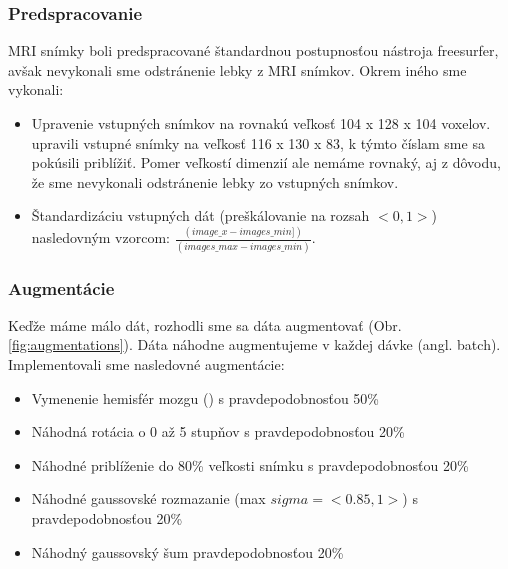 \subsubsection{Predspracovanie}

MRI snímky boli predspracované štandardnou postupnosťou nástroja freesurfer, avšak nevykonali sme odstránenie lebky z MRI snímkov.
Okrem iného sme vykonali:

\begin{itemize}
    \item Upravenie vstupných snímkov na rovnakú veľkosť 104 x 128 x 104 voxelov. \citeauthor*{esmaeilzadeh2018end} upravili vstupné snímky na veľkosť 116 x 130 x 83, k týmto číslam sme sa pokúsili priblížiť. Pomer veľkostí dimenzií ale nemáme rovnaký, aj z dôvodu, že sme nevykonali odstránenie lebky zo vstupných snímkov.
    \item Štandardizáciu vstupných dát (preškálovanie na rozsah $<0, 1>$) nasledovným vzorcom: $\frac{(image\_x - images\_min])}{(images\_max - images\_min)}$.
\end{itemize}

\subsubsection{Augmentácie}

Keďže máme málo dát, rozhodli sme sa dáta augmentovať (Obr. \ref{fig:augmentations}). Dáta náhodne augmentujeme v každej dávke (angl. batch). Implementovali sme nasledovné augmentácie:

\begin{itemize}
    \item Vymenenie hemisfér mozgu (\citeauthor*{esmaeilzadeh2018end}) s pravdepodobnosťou 50\%
    \item Náhodná rotácia o 0 až 5 stupňov s pravdepodobnosťou 20\%
    \item Náhodné priblíženie do 80\% veľkosti snímku s pravdepodobnosťou 20\%
    \item Náhodné gaussovské rozmazanie (max $sigma = <0.85, 1>$) s pravdepodobnosťou 20\%
    \item Náhodný gaussovský šum pravdepodobnosťou 20\%
\end{itemize}

